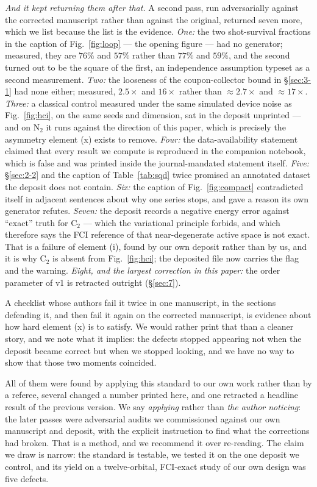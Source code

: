 \documentclass[onecolumn,a4paper]{quantumarticle}
\begin{document}
\emph{And it kept returning them after that.} A second pass, run adversarially against the corrected manuscript rather than against the original, returned seven more, which we list because the list is the evidence. \emph{One:} the two shot-survival fractions in the caption of Fig.~\ref{fig:loop} --- the opening figure --- had no generator; measured, they are $76\%$ and $57\%$ rather than $77\%$ and $59\%$, and the second turned out to be the square of the first, an independence assumption typeset as a second measurement. \emph{Two:} the looseness of the coupon-collector bound in \S\ref{sec:3-1} had none either; measured, $2.5\times$ and $16\times$ rather than ${\approx}2.7\times$ and ${\approx}17\times$. \emph{Three:} a classical control measured under the same simulated device noise as Fig.~\ref{fig:hci}, on the same seeds and dimension, sat in the deposit unprinted --- and on N$_2$ it runs against the direction of this paper, which is precisely the asymmetry element (x) exists to remove. \emph{Four:} the data-availability statement claimed that every result we compute is reproduced in the companion notebook, which is false and was printed inside the journal-mandated statement itself. \emph{Five:} \S\ref{sec:2-2} and the caption of Table~\ref{tab:sqd} twice promised an annotated dataset the deposit does not contain. \emph{Six:} the caption of Fig.~\ref{fig:compact} contradicted itself in adjacent sentences about why one series stops, and gave a reason its own generator refutes. \emph{Seven:} the deposit records a negative energy error against ``exact'' truth for C$_2$ --- which the variational principle forbids, and which therefore says the FCI reference of that near-degenerate active space is not exact. That is a failure of element (i), found by our own deposit rather than by us, and it is why C$_2$ is absent from Fig.~\ref{fig:hci}; the deposited file now carries the flag and the warning. \emph{Eight, and the largest correction in this paper:} the order parameter of v1 is retracted outright (\S\ref{sec:7}).

A checklist whose authors fail it twice in one manuscript, in the sections defending it, and then fail it again on the corrected manuscript, is evidence about how hard element (x) is to satisfy. We would rather print that than a cleaner story, and we note what it implies: the defects stopped appearing not when the deposit became correct but when we stopped looking, and we have no way to show that those two moments coincided.

All of them were found by applying this standard to our own work rather than by a referee, several changed a number printed here, and one retracted a headline result of the previous version. We say \emph{applying} rather than \emph{the author noticing}: the later passes were adversarial audits we commissioned against our own manuscript and deposit, with the explicit instruction to find what the corrections had broken. That is a method, and we recommend it over re-reading. The claim we draw is narrow: the standard is testable, we tested it on the one deposit we control, and its yield on a twelve-orbital, FCI-exact study of our own design was five defects.
\end{document}
